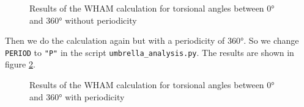 \documentclass[a4paper,11pt]{scrartcl}
\begin{document}
\begin{figure} [htb]
	\caption{Results of the WHAM calculation for torsional angles between 0° and 360° without periodicity}
	\label{fig:wham360}
\end{figure} 

Then we do the calculation again but with a periodicity of 360°. So we change \texttt{PERIOD} to \texttt{"P"} in the script \texttt{umbrella\_analysis.py}. The results are shown in figure \ref{fig:wham360_period}.

\begin{figure} [htb]
	\caption{Results of the WHAM calculation for torsional angles between 0° and 360° with periodicity}
	\label{fig:wham360_period}
\end{figure}
\end{document}
